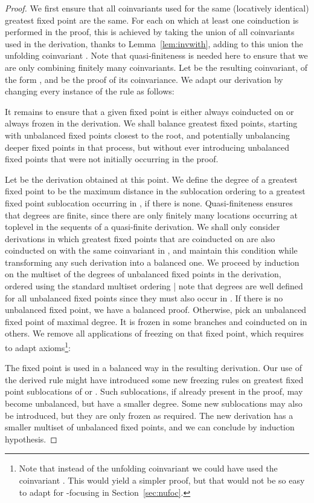 \begin{proof}
We first ensure that all coinvariants used for the same (locatively identical)
greatest fixed point are the same.
For each  on which at least one coinduction is performed
in the proof, this is achieved by taking the union of all coinvariants
used in the derivation,
thanks to Lemma~\ref{lem:invwith},
adding to this union the unfolding coinvariant .
Note that quasi-finiteness is needed here to
ensure that we are only combining finitely many coinvariants.
Let  be the resulting coinvariant,
of the form ,
and  be the proof of its coinvariance.
We adapt our derivation by
changing every instance of the  rule as follows:


It remains to ensure that a given fixed point is either always coinducted on
or always frozen in the derivation.
We shall balance greatest fixed points,
starting with unbalanced fixed points closest to the root,
and potentially unbalancing deeper fixed points in that process,
but without ever introducing unbalanced fixed points that were not initially
occurring in the proof.

Let  be the derivation obtained at this point.
We define the degree of a greatest fixed point
to be the maximum distance in the sublocation ordering
to a greatest fixed point sublocation occurring in ,
 if there is none.
Quasi-finiteness ensures that degrees are finite,
since there are only finitely many locations occurring at toplevel
in the sequents of a quasi-finite derivation.
We shall only consider derivations in which greatest fixed points that
are coinducted on are also coinducted on with the same coinvariant
in , and maintain this condition
while transforming any such derivation into a balanced one.
We proceed by induction on
the multiset of the degrees of unbalanced fixed points in the derivation,
ordered using the standard multiset ordering |
note that degrees are well defined for all unbalanced fixed points since they
must also occur in .
If there is no unbalanced fixed point, we have a balanced proof.
Otherwise, pick an unbalanced fixed point of maximal degree.
It is frozen in some branches and coinducted on in others.
We remove all applications of freezing on that fixed point,
which requires to adapt axioms\footnote{
  Note that instead of the unfolding coinvariant  we could have
  used the coinvariant . This would yield a simpler proof,
  but that would not be so easy to adapt for -focusing in
  Section~\ref{sec:nufoc}.
}:

The fixed point  is used in a balanced way in the resulting derivation.
Our use of the derived rule  might have introduced
some new freezing rules on greatest fixed point
sublocations of  or .
Such sublocations, if already present in the proof,
may become unbalanced, but have a smaller degree.
Some new sublocations may also be introduced,
but they are only frozen as required.
The new derivation has a smaller multiset
of unbalanced fixed points, and we can conclude by induction hypothesis.
\end{proof}

